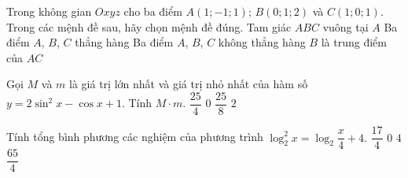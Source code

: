 \begin{ex}%
Trong không gian $Oxyz$ cho ba điểm $A(1;-1;1)$; $B(0;1;2)$ và $C(1;0;1)$. Trong các mệnh đề sau, hãy chọn mệnh đề đúng.
\choice
{Tam giác $ABC$ vuông tại $A$}
{Ba điểm $A$, $B$, $C$ thẳng hàng}
{\True Ba điểm $A$, $B$, $C$ không thẳng hàng}
{$B$ là trung điểm của $AC$}
\end{ex}

\begin{ex}%
Gọi $M$ và $m$ là giá trị lớn nhất và giá trị nhỏ nhất của hàm số $y=2\sin^2x-\cos x+1$. Tính $M\cdot m$.
\choice
{$\dfrac{25}{4}$}
{\True $0$}
{$\dfrac{25}{8}$}
{$2$}
\end{ex}

\begin{ex}%
Tính tổng bình phương các nghiệm của phương trình $\log^2_2x=\log_2\dfrac{x}{4}+4.$
\choice
{$\dfrac{17}{4}$}
{$0$}
{$4$}
{\True $\dfrac{65}{4}$}
\end{ex}

